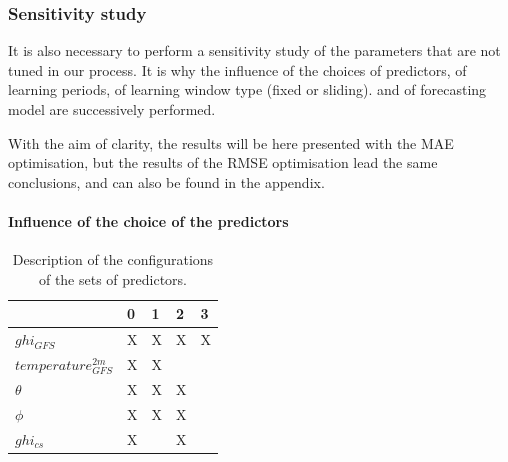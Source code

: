 \subsubsection{Sensitivity study}
It is also necessary to perform a sensitivity study of the parameters that are not tuned in our process. It is why the influence of the choices of predictors, of learning periods, of learning window type (fixed or sliding).
and of forecasting model are successively performed. 

With the aim of clarity, the results will be here presented with the MAE optimisation, but the results of the RMSE optimisation lead the same conclusions, and can also
be found in the appendix.

\paragraph{Influence of the choice of the predictors}
\begin{table}[htb!]
\begin{center}
\begin{tabular}{|l|llll|}
\toprule
{} &  0 &  1 &  2 &  3 \\
\midrule
$ghi_{GFS}$            &  X &  X &  X &  X \\
$temperature^{2m}_{GFS}$ &  X &  X &    &    \\
$\theta$             &  X &  X &  X &    \\
$\phi$            &  X &  X &  X &    \\
$ghi_{cs}$             &  X &    &  X &    \\
\bottomrule
\end{tabular}
\end{center}
\label{tab:pred_configs}
\caption{Description of the configurations of the sets of predictors.}
\end{table}

